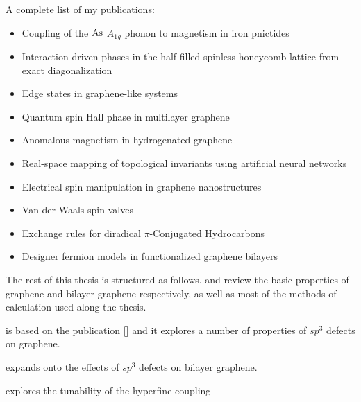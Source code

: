 \bigskip
A complete list of my publications:
\begin{itemize}
   \item Coupling of the $\ce{As}$ $A_{1g}$ phonon to magnetism in iron pnictides\cite{Garcia-Martinez2013}

   \item Interaction-driven phases in the half-filled spinless honeycomb lattice from exact diagonalization\cite{Garcia-Martinez2013a}

   \item Edge states in graphene-like systems\cite{Lado2015}

   \item Quantum spin Hall phase in multilayer graphene\cite{Garcia-Martinez2015}

   \item Anomalous magnetism in hydrogenated graphene\cite{Garcia-Martinez2017}

   \item Real-space mapping of topological invariants using artificial neural networks\cite{Carvalho2018}

   \item Electrical spin manipulation in graphene nanostructures\cite{Ortiz2018}

   \item Van der Waals spin valves\cite{Cardoso2018}

   \item Exchange rules for diradical $\pi$-Conjugated Hydrocarbons\cite{Ortiz2019}

   \item Designer fermion models in functionalized graphene bilayers\cite{Garcia-Martinez2019}
\end{itemize}



\bigskip
The rest of this thesis is structured as follows.  and  review the basic properties of graphene and bilayer graphene respectively, as well as most of the methods of calculation used along the thesis.

 is based on the publication [\cite{Garcia-Martinez2017}] and it explores a number of properties of $sp^3$ defects on graphene.

 expands onto the effects of $sp^3$ defects on bilayer graphene.

 explores the tunability of the hyperfine coupling

